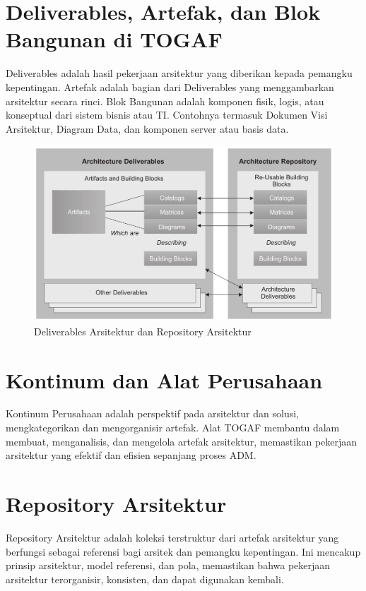 \section{Deliverables, Artefak, dan Blok Bangunan di TOGAF}
Deliverables adalah hasil pekerjaan arsitektur yang diberikan kepada pemangku kepentingan. Artefak adalah bagian dari Deliverables yang menggambarkan arsitektur secara rinci. Blok Bangunan adalah komponen fisik, logis, atau konseptual dari sistem bisnis atau TI. Contohnya termasuk Dokumen Visi Arsitektur, Diagram Data, dan komponen server atau basis data.

\begin{figure}
	\begin{center}
		\includegraphics[width=\textwidth]{../figures/architecture_deliverables}
		\caption{Deliverables Arsitektur dan Repository Arsitektur}
	\end{center}
\end{figure}

\section{Kontinum dan Alat Perusahaan}
Kontinum Perusahaan adalah perspektif pada arsitektur dan solusi, mengkategorikan dan mengorganisir artefak. Alat TOGAF membantu dalam membuat, menganalisis, dan mengelola artefak arsitektur, memastikan pekerjaan arsitektur yang efektif dan efisien sepanjang proses ADM.

\section{Repository Arsitektur}
Repository Arsitektur adalah koleksi terstruktur dari artefak arsitektur yang berfungsi sebagai referensi bagi arsitek dan pemangku kepentingan. Ini mencakup prinsip arsitektur, model referensi, dan pola, memastikan bahwa pekerjaan arsitektur terorganisir, konsisten, dan dapat digunakan kembali.

